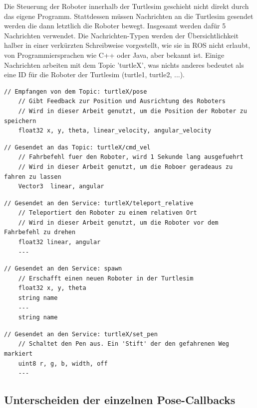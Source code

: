 Die Steuerung der Roboter innerhalb der Turtlesim geschieht nicht direkt durch das eigene Programm. Stattdessen müssen Nachrichten an die Turtlesim gesendet werden die dann letztlich die Roboter bewegt. Insgesamt werden dafür 5 Nachrichten verwendet. Die Nachrichten-Typen werden der Übersichtlichkeit halber in einer verkürzten Schreibweise vorgestellt, wie sie in ROS nicht erlaubt, von Programmiersprachen wie C++ oder Java, aber bekannt ist. Einige Nachrichten arbeiten mit dem Topic 'turtleX', was nichts anderes bedeutet als eine ID für die Roboter der Turtlesim (turtle1, turtle2, ...).

\begin{lstlisting}[style=ros, title=turtlesim/Pose.msg]
	// Empfangen von dem Topic: turtleX/pose
	// Gibt Feedback zur Position und Ausrichtung des Roboters
	// Wird in dieser Arbeit genutzt, um die Position der Roboter zu speichern
	float32 x, y, theta, linear_velocity, angular_velocity
\end{lstlisting}

\begin{lstlisting}[style=ros, title=geometry\_msgs/Twist.msg]
	// Gesendet an das Topic: turtleX/cmd_vel
	// Fahrbefehl fuer den Roboter, wird 1 Sekunde lang ausgefuehrt
	// Wird in dieser Arbeit genutzt, um die Roboer geradeaus zu fahren zu lassen
	Vector3  linear, angular
\end{lstlisting}

\begin{lstlisting}[style=ros, title=turtlesim/TeleportRelative Service]
	// Gesendet an den Service: turtleX/teleport_relative
	// Teleportiert den Roboter zu einem relativen Ort
	// Wird in dieser Arbeit genutzt, um die Roboter vor dem Fahrbefehl zu drehen
	float32 linear, angular
	---
\end{lstlisting}

\begin{lstlisting}[style=ros, title=turtlesim/Spawn Service]
	// Gesendet an den Service: spawn
	// Erschafft einen neuen Roboter in der Turtlesim
	float32 x, y, theta
	string name
	---
	string name
\end{lstlisting}

\begin{lstlisting}[style=ros, title=turtlesim/SetPen Service]
	// Gesendet an den Service: turtleX/set_pen
	// Schaltet den Pen aus. Ein 'Stift' der den gefahrenen Weg markiert
	uint8 r, g, b, width, off
	---
\end{lstlisting}

\subsection*{Unterscheiden der einzelnen Pose-Callbacks}

